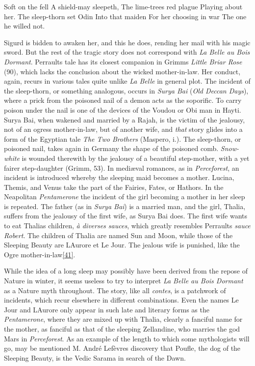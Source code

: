 \documentclass[14pt,a4paper]{memoir}
\begin{document}
{\textquotesingle Soft on the fell} {A shield-may sleepeth,} {The
lime-trees\textquotesingle{} red plague} {Playing about her.} {The
sleep-thorn set Odin} {Into that maiden} {For her choosing in war} {The
one he willed not.\textquotesingle{}}

Sigurd is bidden to awaken her, and this he does, rending her mail with
his magic sword. But the rest of the tragic story does not correspond
with \emph{La Belle au Bois Dormant}. Perrault\textquotesingle s tale
has its closest companion in Grimm\textquotesingle s \emph{Little Briar
Rose} (90), which lacks the conclusion about the wicked mother-in-law.
Her conduct, again, recurs in various tales quite unlike \emph{La Belle}
in general plot. The incident of the sleep-thorn, or something
analogous, occurs in \emph{Surya Bai} (\emph{Old Deccan Days}), where a
prick from the poisoned nail of a demon acts as the soporific. To carry
poison under the nail is one of the devices of the Voudou or Obi man in
Hayti. Surya Bai, when wakened and married by a Rajah, is the victim of
the jealousy, not of an ogress mother-in-law, but of another wife, and
\emph{that} story glides into a form of the Egyptian tale \emph{The Two
Brothers} (Maspero, i.). The sleep-thorn, or poisoned nail, takes again
in Germany the shape of the poisoned comb. \emph{Snow-white} is wounded
therewith by the jealousy of a beautiful step-mother, with a yet fairer
step-daughter (Grimm, 53). In mediæval romances, as in
\emph{Perceforest}, an incident is introduced whereby the sleeping maid
becomes a mother. Lucina, Themis, and Venus take the part of the
Fairies, Fates, or Hathors. In the Neapolitan \emph{Pentamerone} the
incident of the girl becoming a mother in her sleep is repeated. The
father (as in \emph{Surya Bai}) is a married man, and the girl, Thalia,
suffers from the jealousy of the first wife, as Surya Bai does. The
first wife wants to eat Thalia\textquotesingle s children, \emph{à
diverses sauces}, which greatly resembles Perrault\textquotesingle s
\emph{sauce Robert}. The children of Thalia are named Sun and Moon,
while those of the Sleeping Beauty are L\textquotesingle Aurore et Le
Jour. The jealous wife is punished, like the Ogre
mother-in-law\protect\hypertarget{4533318093929944247_33931-h-0.htm.xhtmlux5cux23FNanchor_41}{}{}\protect\hyperlink{4533318093929944247_33931-h-0.htm.xhtmlux5cux23Footnote_41}{{[}41{]}}.

While the idea of a long sleep may possibly have been derived from the
repose of Nature in winter, it seems useless to try to interpret
\emph{La Belle au Bois Dormant} as a Nature myth throughout. The story,
like all \emph{contes}, is a patchwork of incidents, which recur
elsewhere in different combinations. Even the names Le Jour and
L\textquotesingle Aurore only appear in such late and literary forms as
the \emph{Pentamerone}, where they are mixed up with Thalia, clearly a
fanciful name for the mother, as fanciful as that of the sleeping
Zellandine, who marries the god Mars in \emph{Perceforest}. As an
example of the length to which some mythologists will go, may be
mentioned M. André Lefèvre\textquotesingle s discovery that Poufle, the
dog of the Sleeping Beauty, is the Vedic Sarama in search of the Dawn.
\end{document}
